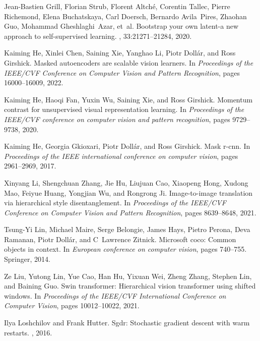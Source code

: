 \documentclass[10pt,twocolumn,letterpaper]{article}
\begin{document}
\begin{thebibliography}{10}
	Jean-Bastien Grill, Florian Strub, Florent Altch{\'e}, Corentin Tallec, Pierre
	Richemond, Elena Buchatskaya, Carl Doersch, Bernardo Avila~Pires, Zhaohan
	Guo, Mohammad Gheshlaghi~Azar, et~al.
	\newblock Bootstrap your own latent-a new approach to self-supervised learning.
	,
	33:21271--21284, 2020.
	
	Kaiming He, Xinlei Chen, Saining Xie, Yanghao Li, Piotr Doll{\'a}r, and Ross
	Girshick.
	\newblock Masked autoencoders are scalable vision learners.
	\newblock In {\em Proceedings of the IEEE/CVF Conference on Computer Vision and
		Pattern Recognition}, pages 16000--16009, 2022.
	
	Kaiming He, Haoqi Fan, Yuxin Wu, Saining Xie, and Ross Girshick.
	\newblock Momentum contrast for unsupervised visual representation learning.
	\newblock In {\em Proceedings of the IEEE/CVF conference on computer vision and
		pattern recognition}, pages 9729--9738, 2020.
	
	Kaiming He, Georgia Gkioxari, Piotr Doll{\'a}r, and Ross Girshick.
	\newblock Mask r-cnn.
	\newblock In {\em Proceedings of the IEEE international conference on computer
		vision}, pages 2961--2969, 2017.
	
	Xinyang Li, Shengchuan Zhang, Jie Hu, Liujuan Cao, Xiaopeng Hong, Xudong Mao,
	Feiyue Huang, Yongjian Wu, and Rongrong Ji.
	\newblock Image-to-image translation via hierarchical style disentanglement.
	\newblock In {\em Proceedings of the IEEE/CVF Conference on Computer Vision and
		Pattern Recognition}, pages 8639--8648, 2021.
	
	Tsung-Yi Lin, Michael Maire, Serge Belongie, James Hays, Pietro Perona, Deva
	Ramanan, Piotr Doll{\'a}r, and C~Lawrence Zitnick.
	\newblock Microsoft coco: Common objects in context.
	\newblock In {\em European conference on computer vision}, pages 740--755.
	Springer, 2014.
	
	Ze Liu, Yutong Lin, Yue Cao, Han Hu, Yixuan Wei, Zheng Zhang, Stephen Lin, and
	Baining Guo.
	\newblock Swin transformer: Hierarchical vision transformer using shifted
	windows.
	\newblock In {\em Proceedings of the IEEE/CVF International Conference on
		Computer Vision}, pages 10012--10022, 2021.
	
	Ilya Loshchilov and Frank Hutter.
	\newblock Sgdr: Stochastic gradient descent with warm restarts.
	, 2016.
	

\end{thebibliography}
\end{document}
